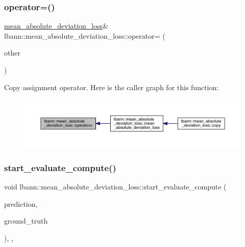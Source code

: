 \subsubsection{\texorpdfstring{operator=()}{operator=()}}
{\footnotesize\ttfamily \hyperlink{classlbann_1_1mean__absolute__deviation__loss}{mean\+\_\+absolute\+\_\+deviation\+\_\+loss}\& lbann\+::mean\+\_\+absolute\+\_\+deviation\+\_\+loss\+::operator= (\begin{DoxyParamCaption}\item[{const \hyperlink{classlbann_1_1mean__absolute__deviation__loss}{mean\+\_\+absolute\+\_\+deviation\+\_\+loss} \&}]{other }\end{DoxyParamCaption})\hspace{0.3cm}{\ttfamily [default]}}

Copy assignment operator. Here is the caller graph for this function\+:\nopagebreak
\begin{figure}[H]
\begin{center}
\leavevmode
\includegraphics[width=350pt]{classlbann_1_1mean__absolute__deviation__loss_a0c69f9e73a06208ccea56b61ba38726f_icgraph}
\end{center}
\end{figure}
\mbox{\label{classlbann_1_1mean__absolute__deviation__loss_a4e4340e4370b824c56b76ed59e2ba879}} 
\subsubsection{\texorpdfstring{start\+\_\+evaluate\+\_\+compute()}{start\_evaluate\_compute()}}
{\footnotesize\ttfamily void lbann\+::mean\+\_\+absolute\+\_\+deviation\+\_\+loss\+::start\+\_\+evaluate\+\_\+compute (\begin{DoxyParamCaption}\item[{const \hyperlink{base_8hpp_a9a697a504ae84010e7439ffec862b470}{Abs\+Dist\+Mat} \&}]{prediction,  }\item[{const \hyperlink{base_8hpp_a9a697a504ae84010e7439ffec862b470}{Abs\+Dist\+Mat} \&}]{ground\+\_\+truth }\end{DoxyParamCaption})\hspace{0.3cm}{\ttfamily [inline]}, {\ttfamily [override]}, {\ttfamily [virtual]}}


